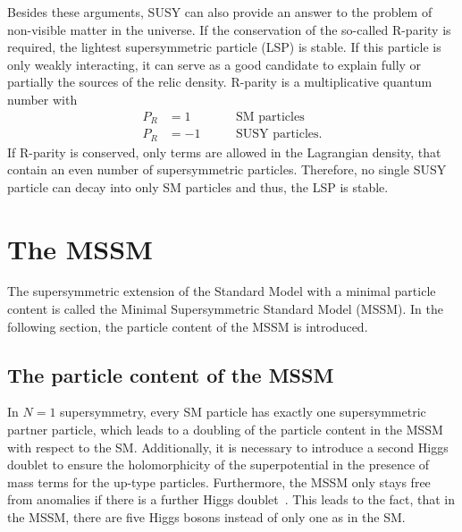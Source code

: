 Besides these arguments, SUSY can also provide an answer to the problem of non-visible matter in the universe.
If the conservation of the so-called R-parity is required, the lightest supersymmetric particle (LSP) is stable.
If this particle is only weakly interacting, it can serve as a good candidate to explain fully or partially the sources of the relic density. 
R-parity is a multiplicative quantum number with 
\begin{equation}
\begin{aligned}
P_R & =  1 \qquad &&\text{SM particles}\\
P_R & = -1 &&\text{SUSY particles}.
\end{aligned}
\end{equation}
If R-parity is conserved, only terms are allowed in the Lagrangian density, that contain an even number of supersymmetric particles.
Therefore, no single SUSY particle can decay into only SM particles and thus, the LSP is stable.



\section{The MSSM}
\label{sec:MSSM}
The supersymmetric extension of the Standard Model with a minimal particle content is called the Minimal Supersymmetric Standard Model (MSSM).
In the following section, the particle content of the MSSM is introduced.

\subsection{The particle content of the MSSM}
In $N=1$ supersymmetry, every SM particle has exactly one supersymmetric partner particle, which leads to a doubling of the particle content in the MSSM with respect to the SM.
Additionally, it is necessary to introduce a second Higgs doublet to ensure the holomorphicity of the superpotential in the presence of mass terms for the up-type particles.
Furthermore, the MSSM only stays free from anomalies if there is a further Higgs doublet~\cite{bib:SUSYPrimer}.
This leads to the fact, that in the MSSM, there are five Higgs bosons instead of only one as in the SM.

